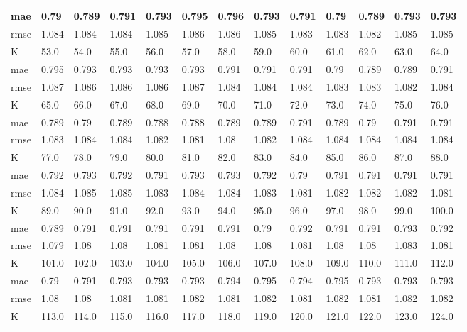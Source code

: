 \begin{appendices}
\begin{center}
\begin{tabularx}{\textwidth}{|l|X|X|X|X|X|X|X|X|X|X|X|X|}
		mae & 0.79 & 0.789 & 0.791 & 0.793 & 0.795 & 0.796 & 0.793 & 0.791 & 0.79 & 0.789 & 0.793 & 0.793 \\ \hline 
		rmse & 1.084 & 1.084 & 1.084 & 1.085 & 1.086 & 1.086 & 1.085 & 1.083 & 1.083 & 1.082 & 1.085 & 1.085 \\ \hline 
		\hline 
		K & 53.0 & 54.0 & 55.0 & 56.0 & 57.0 & 58.0 & 59.0 & 60.0 & 61.0 & 62.0 & 63.0 & 64.0 \\ \hline 
		mae & 0.795 & 0.793 & 0.793 & 0.793 & 0.793 & 0.791 & 0.791 & 0.791 & 0.79 & 0.789 & 0.789 & 0.791 \\ \hline 
		rmse & 1.087 & 1.086 & 1.086 & 1.086 & 1.087 & 1.084 & 1.084 & 1.084 & 1.083 & 1.083 & 1.082 & 1.084 \\ \hline 
		\hline 
		K & 65.0 & 66.0 & 67.0 & 68.0 & 69.0 & 70.0 & 71.0 & 72.0 & 73.0 & 74.0 & 75.0 & 76.0 \\ \hline 
		mae & 0.789 & 0.79 & 0.789 & 0.788 & 0.788 & 0.789 & 0.789 & 0.791 & 0.789 & 0.79 & 0.791 & 0.791 \\ \hline 
		rmse & 1.083 & 1.084 & 1.084 & 1.082 & 1.081 & 1.08 & 1.082 & 1.084 & 1.084 & 1.084 & 1.084 & 1.084 \\ \hline 
		\hline 
		K & 77.0 & 78.0 & 79.0 & 80.0 & 81.0 & 82.0 & 83.0 & 84.0 & 85.0 & 86.0 & 87.0 & 88.0 \\ \hline 
		mae & 0.792 & 0.793 & 0.792 & 0.791 & 0.793 & 0.793 & 0.792 & 0.79 & 0.791 & 0.791 & 0.791 & 0.791 \\ \hline 
		rmse & 1.084 & 1.085 & 1.085 & 1.083 & 1.084 & 1.084 & 1.083 & 1.081 & 1.082 & 1.082 & 1.082 & 1.081 \\ \hline 
		\hline 
		K & 89.0 & 90.0 & 91.0 & 92.0 & 93.0 & 94.0 & 95.0 & 96.0 & 97.0 & 98.0 & 99.0 & 100.0 \\ \hline 
		mae & 0.789 & 0.791 & 0.791 & 0.791 & 0.791 & 0.791 & 0.79 & 0.792 & 0.791 & 0.791 & 0.793 & 0.792 \\ \hline 
		rmse & 1.079 & 1.08 & 1.08 & 1.081 & 1.081 & 1.08 & 1.08 & 1.081 & 1.08 & 1.08 & 1.083 & 1.081 \\ \hline 
		\hline 
		K & 101.0 & 102.0 & 103.0 & 104.0 & 105.0 & 106.0 & 107.0 & 108.0 & 109.0 & 110.0 & 111.0 & 112.0 \\ \hline 
		mae & 0.79 & 0.791 & 0.793 & 0.793 & 0.793 & 0.794 & 0.795 & 0.794 & 0.795 & 0.793 & 0.793 & 0.793 \\ \hline 
		rmse & 1.08 & 1.08 & 1.081 & 1.081 & 1.082 & 1.081 & 1.082 & 1.081 & 1.082 & 1.081 & 1.082 & 1.082 \\ \hline 
		\hline 
		K & 113.0 & 114.0 & 115.0 & 116.0 & 117.0 & 118.0 & 119.0 & 120.0 & 121.0 & 122.0 & 123.0 & 124.0 \\ \hline 

\end{tabularx}
\end{center}
\end{appendices}
